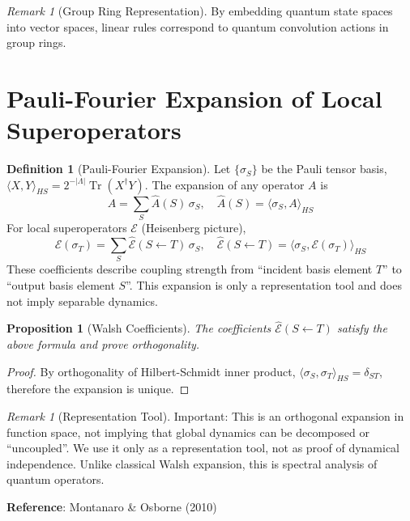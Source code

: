 \documentclass[11pt]{article}
\newtheorem{proposition}[theorem]{Proposition}
\theoremstyle{definition}
\newtheorem{definition}[theorem]{Definition}
\theoremstyle{remark}
\newtheorem{remark}[theorem]{Remark}
\DeclareMathOperator{\Tr}{Tr}
\begin{document}
\begin{remark}[Group Ring Representation]
By embedding quantum state spaces into vector spaces, linear rules correspond to quantum convolution actions in group rings.
\end{remark}

\section{Pauli-Fourier Expansion of Local Superoperators}\label{sec:pauli}

\begin{definition}[Pauli-Fourier Expansion]\label{def:pauli}
Let \( \{\sigma_S\} \) be the Pauli tensor basis, \( \langle X,Y\rangle_{HS}=2^{-|\Lambda|}\Tr(X^\dagger Y) \). The expansion of any operator \( A \) is
\[
A=\sum_S \widehat{A}(S)\,\sigma_S,\quad \widehat{A}(S)=\langle \sigma_S,A\rangle_{HS}
\]
For local superoperators \( \mathcal{E} \) (Heisenberg picture),
\[
\mathcal{E}(\sigma_T)=\sum_S \widehat{\mathcal{E}}(S\!\leftarrow\!T)\,\sigma_S,\quad
\widehat{\mathcal{E}}(S\!\leftarrow\!T)=\langle \sigma_S,\mathcal{E}(\sigma_T)\rangle_{HS}
\]
These coefficients describe coupling strength from ``incident basis element \( T \)'' to ``output basis element \( S \)''. This expansion is only a representation tool and does not imply separable dynamics.
\end{definition}

\begin{proposition}[Walsh Coefficients]\label{prop:pauli}
The coefficients \( \widehat{\mathcal{E}}(S\!\leftarrow\!T) \) satisfy the above formula and prove orthogonality.
\end{proposition}

\begin{proof}
By orthogonality of Hilbert-Schmidt inner product, \( \langle \sigma_S, \sigma_T \rangle_{HS} = \delta_{ST} \), therefore the expansion is unique.
\end{proof}

\begin{remark}[Representation Tool]
Important: This is an orthogonal expansion in function space, not implying that global dynamics can be decomposed or ``uncoupled''. We use it only as a representation tool, not as proof of dynamical independence. Unlike classical Walsh expansion, this is spectral analysis of quantum operators.

\textbf{Reference}: Montanaro \& Osborne (2010)
\end{remark}
\end{document}
